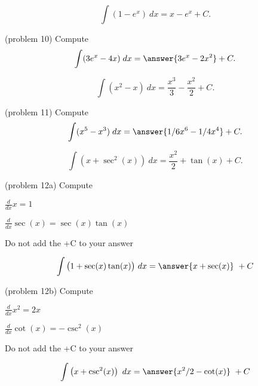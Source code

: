 \documentclass[handout]{ximera}
\begin{document}
\begin{example}[example 10]
\[
\int \left(1 - e^x\right) \ dx = x - e^x + C.
\]
\end{example}

\begin{problem}(problem 10)
Compute
\[
\int (3e^x - 4x) \; dx = \answer{3e^x - 2x^2} + C.
\]
\end{problem}



\begin{example}[example 11]
\[
\int \left(x^2 - x\right) \ dx = \dfrac{x^3}{3} - \dfrac{x^2}{2} + C.
\]
\end{example}


\begin{problem}(problem 11)
Compute
\[
\int (x^5 - x^3) \; dx = \answer{1/6 x^6 - 1/4 x^4} + C.
\]
\end{problem}




\begin{example}[example 12]
\[
\int \left(x + \sec^2(x)\right) \ dx = \frac{x^2}{2} + \tan(x) + C.
\]
\end{example}

\begin{problem}(problem 12a)
Compute


\begin{hint}
$\frac{d}{dx} x = 1$
\end{hint}
\begin{hint}
$\frac{d}{dx} \sec(x) = \sec(x)\tan(x)$
\end{hint}
\begin{hint}
\begin{center}
Do not add the +C to your answer
\end{center}
\end{hint}

\[
\int \big(1 + \sec(x)\tan(x) \big) \ dx =
\answer{x + \sec(x)} \ +  C
\]
\end{problem}


\begin{problem}(problem 12b)
Compute


\begin{hint}
$\frac{d}{dx} x^2 = 2x$
\end{hint}
\begin{hint}
$\frac{d}{dx} \cot(x) = -\csc^2(x)$
\end{hint}
\begin{hint}
\begin{center}
Do not add the +C to your answer
\end{center}
\end{hint}

\[
\int \left(x + \csc^2(x) \right) \ dx =
\answer{x^2 /2 - \cot(x)} \ +  C
\]
\end{problem}
\end{document}
